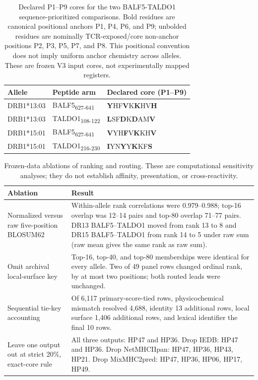 \documentclass[11pt]{article}
\begin{document}
\begin{table}[H]
\centering
\small
\caption{Declared P1--P9 cores for the two BALF5-TALDO1 sequence-prioritized comparisons. Bold residues are canonical positional anchors P1, P4, P6, and P9; unbolded residues are nominally TCR-exposed/core non-anchor positions P2, P3, P5, P7, and P8. This positional convention does not imply uniform anchor chemistry across alleles. These are frozen V3 input cores, not experimentally mapped registers.}
\label{tab:s2a}
\setlength{\tabcolsep}{5pt}
\begin{tabular}{lll}
\toprule
Allele & Peptide arm & Declared core (P1--P9) \\\midrule
DRB1*13:03 & BALF5\textsubscript{627-641} & \textbf{Y}HF\textbf{V}K\textbf{K}HV\textbf{H} \\
DRB1*13:03 & TALDO1\textsubscript{108-122} & \textbf{L}SF\textbf{D}K\textbf{D}AM\textbf{V} \\
DRB1*15:01 & BALF5\textsubscript{627-641} & \textbf{V}YH\textbf{F}V\textbf{K}KH\textbf{V} \\
DRB1*15:01 & TALDO1\textsubscript{216-230} & \textbf{I}YN\textbf{Y}Y\textbf{K}KF\textbf{S} \\
\bottomrule
\end{tabular}
\end{table}

\begin{table}[H]
\centering
\scriptsize
\caption{Frozen-data ablations of ranking and routing. These are computational sensitivity analyses; they do not establish affinity, presentation, or cross-reactivity.}
\label{tab:s8}
\setlength{\tabcolsep}{3pt}\renewcommand{\arraystretch}{1.15}
\begin{tabular}{p{}p{}}
\toprule
Ablation & Result \\\midrule
Normalized versus raw five-position BLOSUM62 & Within-allele rank correlations were 0.979--0.988; top-16 overlap was 12--14 pairs and top-80 overlap 71--77 pairs. DR13 BALF5--TALDO1 moved from rank 13 to 8 and DR15 BALF5--TALDO1 from rank 14 to 5 under raw sum (raw mean gives the same rank as raw sum).\\
Omit archival local-surface key & Top-16, top-40, and top-80 memberships were identical for every allele. Two of 49 panel rows changed ordinal rank, by at most two positions; both routed leads were unchanged.\\
Sequential tie-key accounting & Of 6,117 primary-score-tied rows, physicochemical mismatch resolved 4,688, identity 13 additional rows, local surface 1,406 additional rows, and lexical identifier the final 10 rows.\\
Leave one output out at strict 20\%, exact-core rule & All three outputs: HP47 and HP36. Drop IEDB: HP47 and HP36. Drop NetMHCIIpan: HP47, HP36, HP43, HP21. Drop MixMHC2pred: HP47, HP36, HP06, HP17, HP49.\\
\bottomrule
\end{tabular}
\end{table}

\FloatBarrier

\end{document}
